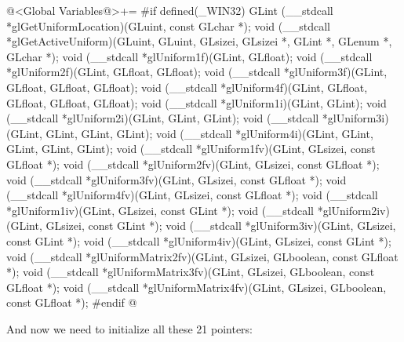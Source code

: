 \iniciocodigo
@<Global Variables@>+=
#if defined(_WIN32)
GLint (__stdcall *glGetUniformLocation)(GLuint, const GLchar *);
void (__stdcall *glGetActiveUniform)(GLuint, GLuint, GLsizei, GLsizei *, GLint *,
                                     GLenum *, GLchar *);
void (__stdcall *glUniform1f)(GLint, GLfloat);
void (__stdcall *glUniform2f)(GLint, GLfloat, GLfloat);
void (__stdcall *glUniform3f)(GLint, GLfloat, GLfloat, GLfloat);
void (__stdcall *glUniform4f)(GLint, GLfloat, GLfloat, GLfloat, GLfloat);
void (__stdcall *glUniform1i)(GLint, GLint);
void (__stdcall *glUniform2i)(GLint, GLint, GLint);
void (__stdcall *glUniform3i)(GLint, GLint, GLint, GLint);
void (__stdcall *glUniform4i)(GLint, GLint, GLint, GLint, GLint);
void (__stdcall *glUniform1fv)(GLint, GLsizei, const GLfloat *);
void (__stdcall *glUniform2fv)(GLint, GLsizei, const GLfloat *);
void (__stdcall *glUniform3fv)(GLint, GLsizei, const GLfloat *);
void (__stdcall *glUniform4fv)(GLint, GLsizei, const GLfloat *);
void (__stdcall *glUniform1iv)(GLint, GLsizei, const GLint *);
void (__stdcall *glUniform2iv)(GLint, GLsizei, const GLint *);
void (__stdcall *glUniform3iv)(GLint, GLsizei, const GLint *);
void (__stdcall *glUniform4iv)(GLint, GLsizei, const GLint *);
void (__stdcall *glUniformMatrix2fv)(GLint, GLsizei, GLboolean, const GLfloat *);
void (__stdcall *glUniformMatrix3fv)(GLint, GLsizei, GLboolean, const GLfloat *);
void (__stdcall *glUniformMatrix4fv)(GLint, GLsizei, GLboolean, const GLfloat *);
#endif
@
\fimcodigo

And now we need to initialize all these 21 pointers:

